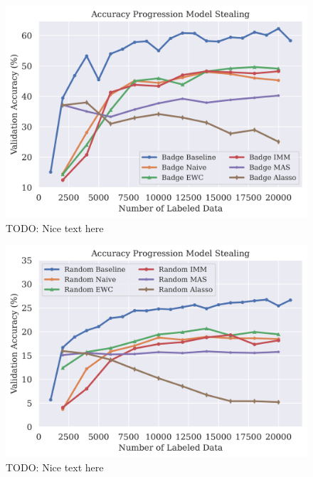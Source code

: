 \begin{figure}[h]
    \centering
    \includegraphics[width=0.8\linewidth]{images/results_CALMS/cifar_label_badge.png}
    \caption[Accuracy Comparison for Model Stealing on CIFAR10 using the top1-label and the Active Learning strategy Badge]{TODO: Nice text here}
    \label{fig:CALMSCIFAR10LabelBadge}
\end{figure}

\begin{figure}[h]
    \centering
    \includegraphics[width=0.8\linewidth]{images/results_CALMS/cifar100_softmax_random.png}
    \caption[Accuracy Comparison for Model Stealing on CIFAR10 using the softmax output and the Active Learning strategy Random]{TODO: Nice text here}
    \label{fig:CALMSCIFAR10SoftmaxRandom}
\end{figure}

